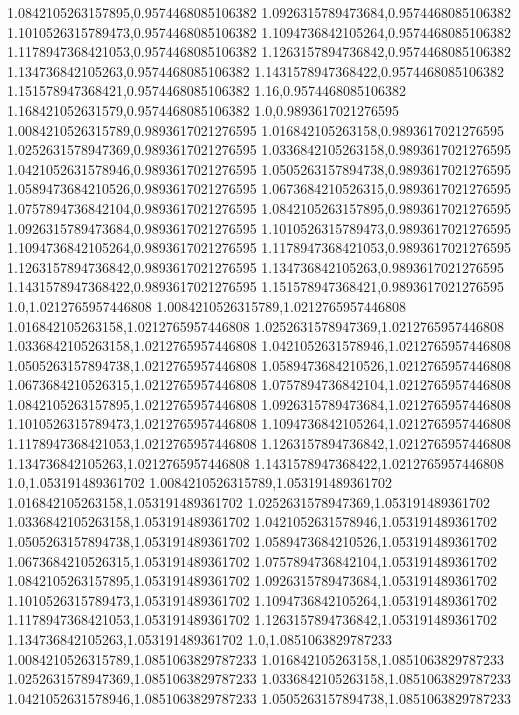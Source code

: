 1.0842105263157895,0.9574468085106382
1.0926315789473684,0.9574468085106382
1.1010526315789473,0.9574468085106382
1.1094736842105264,0.9574468085106382
1.1178947368421053,0.9574468085106382
1.1263157894736842,0.9574468085106382
1.134736842105263,0.9574468085106382
1.1431578947368422,0.9574468085106382
1.151578947368421,0.9574468085106382
1.16,0.9574468085106382
1.168421052631579,0.9574468085106382
1.0,0.9893617021276595
1.0084210526315789,0.9893617021276595
1.016842105263158,0.9893617021276595
1.0252631578947369,0.9893617021276595
1.0336842105263158,0.9893617021276595
1.0421052631578946,0.9893617021276595
1.0505263157894738,0.9893617021276595
1.0589473684210526,0.9893617021276595
1.0673684210526315,0.9893617021276595
1.0757894736842104,0.9893617021276595
1.0842105263157895,0.9893617021276595
1.0926315789473684,0.9893617021276595
1.1010526315789473,0.9893617021276595
1.1094736842105264,0.9893617021276595
1.1178947368421053,0.9893617021276595
1.1263157894736842,0.9893617021276595
1.134736842105263,0.9893617021276595
1.1431578947368422,0.9893617021276595
1.151578947368421,0.9893617021276595
1.0,1.0212765957446808
1.0084210526315789,1.0212765957446808
1.016842105263158,1.0212765957446808
1.0252631578947369,1.0212765957446808
1.0336842105263158,1.0212765957446808
1.0421052631578946,1.0212765957446808
1.0505263157894738,1.0212765957446808
1.0589473684210526,1.0212765957446808
1.0673684210526315,1.0212765957446808
1.0757894736842104,1.0212765957446808
1.0842105263157895,1.0212765957446808
1.0926315789473684,1.0212765957446808
1.1010526315789473,1.0212765957446808
1.1094736842105264,1.0212765957446808
1.1178947368421053,1.0212765957446808
1.1263157894736842,1.0212765957446808
1.134736842105263,1.0212765957446808
1.1431578947368422,1.0212765957446808
1.0,1.053191489361702
1.0084210526315789,1.053191489361702
1.016842105263158,1.053191489361702
1.0252631578947369,1.053191489361702
1.0336842105263158,1.053191489361702
1.0421052631578946,1.053191489361702
1.0505263157894738,1.053191489361702
1.0589473684210526,1.053191489361702
1.0673684210526315,1.053191489361702
1.0757894736842104,1.053191489361702
1.0842105263157895,1.053191489361702
1.0926315789473684,1.053191489361702
1.1010526315789473,1.053191489361702
1.1094736842105264,1.053191489361702
1.1178947368421053,1.053191489361702
1.1263157894736842,1.053191489361702
1.134736842105263,1.053191489361702
1.0,1.0851063829787233
1.0084210526315789,1.0851063829787233
1.016842105263158,1.0851063829787233
1.0252631578947369,1.0851063829787233
1.0336842105263158,1.0851063829787233
1.0421052631578946,1.0851063829787233
1.0505263157894738,1.0851063829787233
